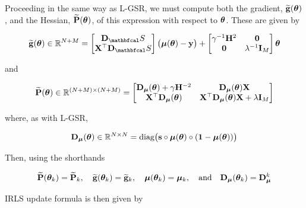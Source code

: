 Proceeding in the same way as L-GSR, we must compute both the gradient, $\widetilde{\mathbf{g}}(\boldsymbol{\theta})$, and the Hessian, $\widetilde{\mathbf{P}}(\boldsymbol{\theta})$, of this expression with respect to $\boldsymbol{\theta}$. These are given by 

\begin{equation}
    \widetilde{\g}(\thetaa) \in \R^{N + M} = \begin{bmatrix}
        \D_\St \\ \X^\top \D_\St
    \end{bmatrix} \big(\muu(\thetaa) - \y\big) + \begin{bmatrix}
        \gamma^{-1} \HH^2 & \zero \\
    \zero & \lambda^{-1} \I_M
    \end{bmatrix} \thetaa
\end{equation}

and 

\begin{equation}
    \widetilde{\mathbf{P}}(\boldsymbol{\theta})  \in \mathbb{R}^{(N + M) \times (N + M)} = \begin{bmatrix}
        \mathbf{D}_{\boldsymbol{\mu}}(\boldsymbol{\theta}) + \gamma \mathbf{H}^{-2} & \mathbf{D}_{\boldsymbol{\mu}}(\boldsymbol{\theta}) \mathbf{X} \\ 
        \mathbf{X}^\top \mathbf{D}_{\boldsymbol{\mu}}(\boldsymbol{\theta})  & \mathbf{X}^\top \mathbf{D}_{\boldsymbol{\mu}}(\boldsymbol{\theta}) \mathbf{X} + \lambda \mathbf{I}_M
    \end{bmatrix}
\end{equation}

where, as with L-GSR, 

\begin{equation}
    \mathbf{D}_{\boldsymbol{\mu}}(\boldsymbol{\theta}) \in \mathbb{R}^{N \times N} = \text{diag}\big(\mathbf{s} \circ \boldsymbol{\mu}(\boldsymbol{\theta}) \circ (\mathbf{1} - \boldsymbol{\mu}(\boldsymbol{\theta}))\big)
\end{equation}

Then, using the shorthands 

\begin{equation*}
    \widetilde{\mathbf{P}}(\boldsymbol{\theta}_k) = \widetilde{\mathbf{P}}_k, \quad \widetilde{\mathbf{g}}(\boldsymbol{\theta}_k) = \widetilde{\mathbf{g}}_k, \quad \boldsymbol{\mu}(\boldsymbol{\theta}_k) = \boldsymbol{\mu}_k, \quad \text{and} \quad \mathbf{D}_{\boldsymbol{\mu}}(\boldsymbol{\theta}_k) = \mathbf{D}_{\boldsymbol{\mu}}^k
\end{equation*}

IRLS update formula is then given by 


